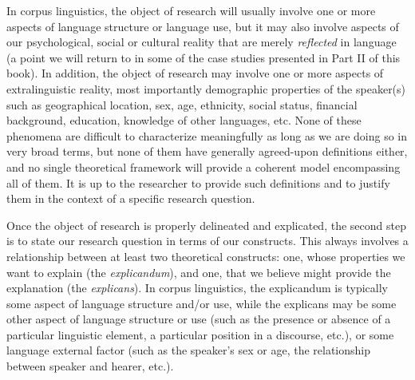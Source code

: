 In corpus linguistics, the object of research will usually involve one or more aspects of language structure or language use, but it may also involve aspects of our psychological, social or cultural reality that are merely \emph{reflected} in language (a point we will return to in some of the case studies presented in Part II of this book). In addition, the object of research may involve one or more aspects of extralinguistic reality, most importantly demographic properties of the speaker(s) such as geographical location, sex, age, ethnicity, social status, financial background, education, knowledge of other languages, etc. None of these phenomena are difficult to characterize meaningfully as long as we are doing so in very broad terms, but none of them have generally agreed-upon definitions either, and no single theoretical framework will provide a coherent model encompassing all of them. It is up to the researcher to provide such definitions and to justify them in the context of a specific research question.

Once the object of research is properly delineated and explicated, the second step is to state our research question in terms of our constructs. This always involves a relationship between at least two theoretical constructs: one, whose properties we want to explain (the \emph{explicandum}), and one, that we believe might provide the explanation  (the \emph{explicans}). In corpus linguistics, the explicandum is typically some aspect of language structure and/or use, while the explicans may be some other aspect of language structure or use (such as the presence or absence of a particular linguistic element, a particular position in a discourse, etc.), or some language external factor (such as the speaker's sex or age, the relationship between speaker and hearer, etc.).

